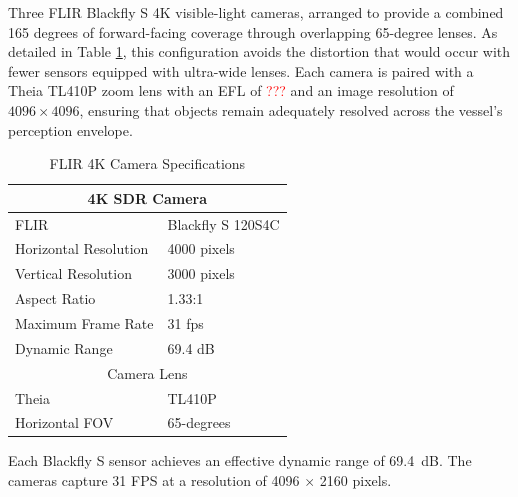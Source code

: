 \documentclass{erauthesis}
\begin{document}
Three FLIR Blackfly S 4K visible-light cameras, arranged to provide a combined 165 degrees of forward-facing coverage through overlapping 65-degree lenses.  
As detailed in Table \ref{table:SDR_camera_specs}, this configuration avoids the distortion that would occur with fewer sensors equipped with ultra-wide lenses.
Each camera is paired with a Theia TL410P zoom lens with an \ac{EFL} of \textcolor{red}{???} and an image resolution of $4096 \times 4096$, ensuring that objects remain adequately resolved across the vessel's perception envelope.  
\begin{table}[htbp]
\centering
\caption{FLIR 4K Camera Specifications}
\begin{tabular}{ll}
\hline
\multicolumn{2}{c}{4K SDR Camera}\\
\hline
\hline
FLIR & Blackfly S 120S4C \\
Horizontal Resolution & 4000 pixels \\
Vertical Resolution & 3000 pixels \\
Aspect Ratio & 1.33:1 \\
Maximum Frame Rate & 31 fps \\
Dynamic Range & 69.4 dB \\
\multicolumn{2}{c}{Camera Lens}\\
\hline
Theia & TL410P\\
Horizontal \Ac{FOV} & 65-degrees\\
\hline
\end{tabular}
\label{table:SDR_camera_specs}
\end{table}

Each Blackfly S sensor achieves an effective dynamic range of 69.4~dB.  
The cameras capture 31 \ac{FPS} at a resolution of 4096 $\times$ 2160 pixels.
\end{document}

